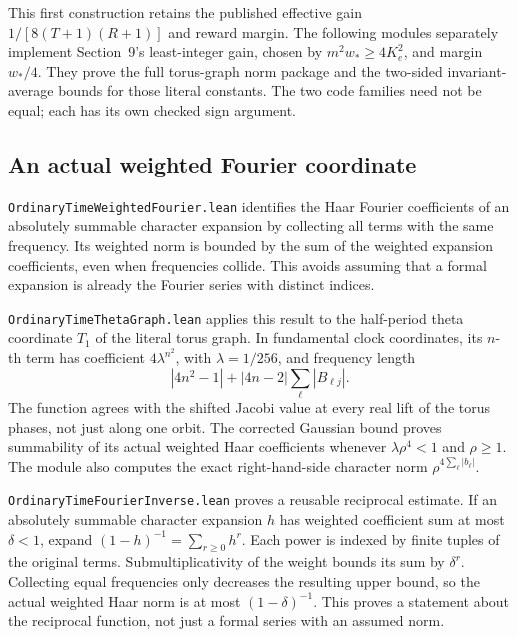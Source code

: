 \documentclass[11pt]{article}
\newcommand{\code}[1]{{\small\nolinkurl{#1}}}
\begin{document}
This first construction retains the published effective gain
$1/[8(T+1)(R+1)]$ and reward margin. The following modules separately
implement Section~9's least-integer gain, chosen by $m^2w_*\ge4K_e^2$,
and margin $w_*/4$. They prove the full torus-graph norm package and the
two-sided invariant-average bounds for those literal constants. The two
code families need not be equal; each has its own checked sign argument.

\subsection{An actual weighted Fourier coordinate}

\code{OrdinaryTimeWeightedFourier.lean} identifies the Haar Fourier
coefficients of an absolutely summable character expansion by collecting
all terms with the same frequency. Its weighted norm is bounded by the
sum of the weighted expansion coefficients, even when frequencies collide.
This avoids assuming that a formal expansion is already the Fourier
series with distinct indices.

\code{OrdinaryTimeThetaGraph.lean} applies this result to the half-period
theta coordinate $T_1$ of the literal torus graph. In fundamental clock
coordinates, its $n$-th term has coefficient $4\lambda^{n^2}$, with
$\lambda=1/256$, and frequency length
\[
 |4n^2-1|+|4n-2|\sum_\ell |B_{\ell j}|.
\]
The function agrees with the shifted Jacobi value at every real lift of
the torus phases, not just along one orbit. The corrected Gaussian bound
proves summability of its actual weighted Haar coefficients whenever
$\lambda\rho^4<1$ and $\rho\ge1$. The module also computes the exact
right-hand-side character norm $\rho^{4\sum_\ell|b_\ell|}$.

\code{OrdinaryTimeFourierInverse.lean} proves a reusable reciprocal
estimate. If an absolutely summable character expansion $h$ has weighted
coefficient sum at most $\delta<1$, expand
$(1-h)^{-1}=\sum_{r\ge0}h^r$. Each power is indexed by finite tuples of
the original terms. Submultiplicativity of the weight bounds its sum by
$\delta^r$. Collecting equal frequencies only decreases the resulting
upper bound, so the actual weighted Haar norm is at most $(1-\delta)^{-1}$.
This proves a statement about the reciprocal function, not just a formal
series with an assumed norm.
\end{document}
